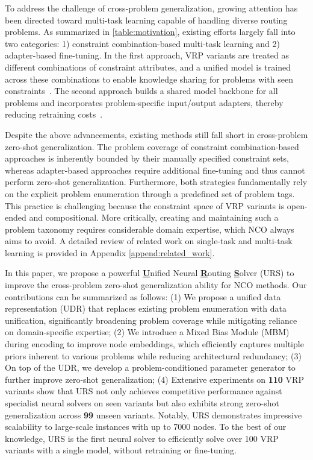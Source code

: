 \documentclass{article}
\theoremstyle{plain}
\theoremstyle{definition}
\theoremstyle{remark}
\begin{document}
To address the challenge of cross-problem generalization, growing attention has been directed toward multi-task learning capable of handling diverse routing problems. As summarized in \cref{table:motivation}, existing efforts largely fall into two categories: 1) constraint combination-based multi-task learning and 2) adapter-based fine-tuning. In the first approach, VRP variants are treated as different combinations of constraint attributes, and a unified model is trained across these combinations to enable knowledge sharing for problems with seen constraints~\citep{liu2024mtpomo,zhou2024mvmoe,li2025cada,berto2024routefinder,zheng2025mtl_kd}. The second approach builds a shared model backbone for all problems and incorporates problem-specific input/output adapters, thereby reducing retraining costs~\citep{lin2024cross,drakulic2025goal,wang2025mtl_mab}.

Despite the above advancements, existing methods still fall short in cross-problem zero-shot generalization. The problem coverage of constraint combination-based approaches is inherently bounded by their manually specified constraint sets, whereas adapter-based approaches require additional fine-tuning and thus cannot perform zero-shot generalization. Furthermore, both strategies fundamentally rely on the explicit problem enumeration through a predefined set of problem tags. This practice is challenging because the constraint space of VRP variants is open-ended and compositional. More critically, creating and maintaining such a problem taxonomy requires considerable domain expertise, which NCO always aims to avoid. A detailed review of related work on single-task and multi-task learning is provided in Appendix \ref{append:related_work}.

In this paper, we propose a powerful \textbf{\underline{U}}nified Neural \textbf{\underline{R}}outing \textbf{\underline{S}}olver (URS) to improve the cross-problem zero-shot generalization ability for NCO methods. Our contributions can be summarized as follows: (1) We propose a unified data representation (UDR) that replaces existing problem enumeration with data unification, significantly broadening problem coverage while mitigating reliance on domain-specific expertise; (2) We introduce a Mixed Bias Module (MBM) during encoding to improve node embeddings, which efficiently captures multiple priors inherent to various problems while reducing architectural redundancy; (3) On top of the UDR, we develop a problem-conditioned parameter generator to further improve zero-shot generalization; (4) Extensive experiments on \textbf{110} VRP variants show that URS not only achieves competitive performance against specialist neural solvers on seen variants but also exhibits strong zero-shot generalization across \textbf{99} unseen variants. Notably, URS demonstrates impressive scalability to large-scale instances with up to 7000 nodes. To the best of our knowledge, URS is the first neural solver to efficiently solve over 100 VRP variants with a single model, without retraining or fine-tuning.
\end{document}
